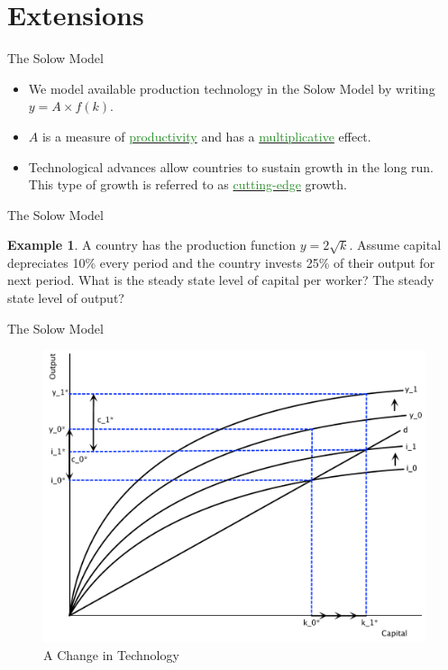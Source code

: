 \documentclass[xcolor={dvipsnames},pdf, hyperref={colorlinks=true, citecolor=ForestGreen, linkcolor=BlueViolet, urlcolor=Magenta}]{beamer}
\theoremstyle{definition}
\newtheorem{exmp}{Example}[section]
\newcommand{\dd}[1]{{\underline{\textcolor{ForestGreen}{#1}}}}
\begin{document}
\section{Extensions}

\begin{frame}{The Solow Model}
\begin{itemize}
	\item We model available production technology in the Solow Model by writing $y = A \times f(k)$.
	\item $A$ is a measure of \dd{productivity} and has a \dd{multiplicative} effect.
	\item Technological advances allow countries to sustain growth in the long run. This type of growth is referred to as \dd{cutting-edge} growth.
\end{itemize}
\end{frame}

\begin{frame}{The Solow Model}
\begin{exmp}
	A country has the production function $y = 2\sqrt{k} $. Assume capital depreciates 10\% every period and the country invests 25\% of their output for next period. What is the steady state level of capital per worker? The steady state level of output?
\end{exmp} 
\end{frame}

\begin{frame}[b]{The Solow Model}
\begin{figure}[H]
	\centering
	\includegraphics[scale=.35]{plot88.pdf}
	\caption{A Change in Technology}
\end{figure}

\end{frame}
\end{document}
